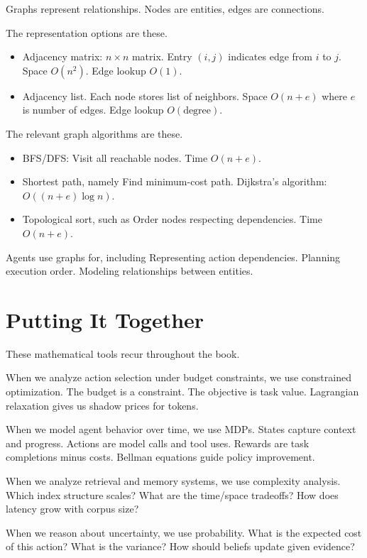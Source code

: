 Graphs represent relationships. Nodes are entities, edges are connections.

The representation options are these.
\begin{itemize}
\item Adjacency matrix: $n \times n$ matrix. Entry $(i,j)$ indicates edge from $i$ to $j$. Space $O(n^2)$. Edge lookup $O(1)$.
\item Adjacency list. Each node stores list of neighbors. Space $O(n + e)$ where $e$ is number of edges. Edge lookup $O(\text{degree})$.
\end{itemize}

The relevant graph algorithms are these.
\begin{itemize}
\item BFS/DFS: Visit all reachable nodes. Time $O(n + e)$.
\item Shortest path, namely Find minimum-cost path. Dijkstra's algorithm: $O((n + e) \log n)$.
\item Topological sort, such as Order nodes respecting dependencies. Time $O(n + e)$.
\end{itemize}

Agents use graphs for, including Representing action dependencies. Planning execution order. Modeling relationships between entities.

\section{Putting It Together}

These mathematical tools recur throughout the book.

When we analyze action selection under budget constraints, we use constrained optimization. The budget is a constraint. The objective is task value. Lagrangian relaxation gives us shadow prices for tokens.

When we model agent behavior over time, we use MDPs. States capture context and progress. Actions are model calls and tool uses. Rewards are task completions minus costs. Bellman equations guide policy improvement.

When we analyze retrieval and memory systems, we use complexity analysis. Which index structure scales? What are the time/space tradeoffs? How does latency grow with corpus size?

When we reason about uncertainty, we use probability. What is the expected cost of this action? What is the variance? How should beliefs update given evidence?


